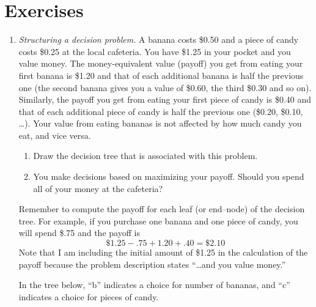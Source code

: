 \section{Exercises}
\begin{enumerate}

\item \emph{Structuring a decision problem.} A banana costs \$0.50
and a piece of candy costs \$0.25 at the local cafeteria.
You have \$1.25 in your pocket and you value money. The money-equivalent
value (payoff) you get from eating your first banana is \$1.20 and
that of each additional banana is half the previous one (the second
banana gives you a value of \$0.60, the third \$0.30 and so on).
Similarly, the payoff you get from eating your first piece of candy is
\$0.40 and that of each additional piece of candy is half the previous one
(\$0.20, \$0.10, \ldots). Your value from eating bananas is not affected
by how much candy you eat, and vice versa.

\begin{enumerate}
\item Draw the decision tree that is associated with this problem. 
\item You make decisions based on maximizing your payoff. Should you
  spend all of your money at the cafeteria?
\end{enumerate}

Remember to compute the payoff for each leaf (or end--node) of the
decision tree. For example, if you purchase one banana and one piece
of candy, you will spend \$.75 and the payoff is
  \[ \$1.25 - .75 + 1.20 + .40 = \$2.10 \]
  Note that I am including the initial amount of \$1.25 in the
  calculation of the payoff because the problem description states
  ``\ldots and you value money.''

\begin{solution}
\bs
In the tree below, ``b'' indicates a choice for number of
bananas, and ``c'' indicates a choice for pieces of candy.


\end{solution}
\end{enumerate}
